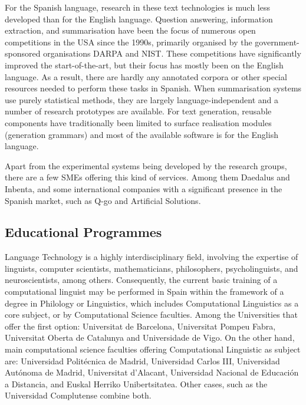 \begin{multicols}{2}
For the Spanish language, research in these text technologies is much less developed than for the English language. Question answering, information extraction, and summarisation have been the focus of numerous open competitions in the USA since the 1990s, primarily organised by the government-sponsored organisations DARPA and NIST. These competitions have significantly improved the start-of-the-art, but their focus has mostly been on the English language. As a result, there are hardly any annotated corpora or other special resources needed to perform these tasks in Spanish. When summarisation systems use purely statistical methods, they are largely language-independent and a number of research prototypes are available. For text generation, reusable components have traditionally been limited to surface realisation modules (generation grammars) and most of the available software is for the English language.

Apart from the experimental systems being developed by the research groups, there are a few SMEs offering this kind of services. Among them Daedalus and Inbenta, and some international companies with a significant presence in the Spanish market, such as Q-go  and Artificial Solutions.

\subsection{Educational Programmes}

Language Technology is a highly interdisciplinary field, involving the expertise of linguists, computer scientists, mathematicians, philosophers, psycholinguists, and neuroscientists, among others. Consequently, the current basic training of a computational linguist may be performed in Spain within the framework of a degree in Philology or Linguistics, which includes Computational Linguistics as a core subject, or by Computational Science faculties. Among the Universities that offer the first option: Universitat de Barcelona, Universitat Pompeu Fabra, Universitat Oberta de Catalunya and Universidade de Vigo. On the other hand, main computational science faculties offering Computational Linguistic as subject are: Universidad Politécnica de Madrid, Universidad Carlos III, Universidad Autónoma de Madrid, Universitat d’Alacant, Universidad Nacional de Educación a Distancia, and Euskal Herriko Unibertsitatea. Other cases, such as the Universidad Complutense combine both.


\end{multicols}
